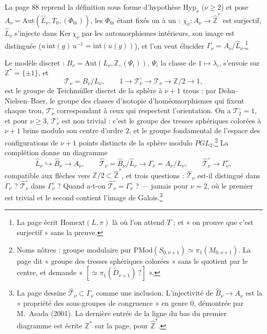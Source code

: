 \documentclass[11pt,a4paper]{article}
\begin{document}
La page 88 reprend la définition sous forme d'hypothèse $\mathrm{Hyp}_{\nu}$
($\nu \geqslant 2$) et pose $A_{\nu} = \mathrm{Aut}(\widehat{L}_{\nu}, T_{0},
(\Phi_{0i}))$, les $\Phi_{0i}$ étant fixés un à un : $\chi_{\nu} : A_{\nu} \to
\widehat{\mathbb{Z}}^{*}$ est surjectif, $\widehat{L}_{\nu}$ s'injecte dans
$\mathrm{Ker}\,\chi_{\nu}$ par les automorphismes intérieurs, son image est
distinguée ($u\, \mathrm{int}(g)\, u^{-1} = \mathrm{int}(u(g))$), et l'on veut
élucider $\Gamma_{\nu} = A_{\nu}/\widehat{L}_{\nu}$.\footnote{La page écrit
$\mathrm{Homext}(L, \pi)$ là où l'on attend $T$ ; et « on prouve que c'est
surjectif » sans la preuve.}

Le modèle discret : $B_{\nu} = \mathrm{Aut}(L_{\nu}, \mathbb{Z}, (\Psi_{i}))$, $\Psi_{i}$
la classe de $1 \mapsto \lambda_{i}$, s'envoie sur $\mathbb{Z}^{*} = \{\pm 1\}$, et
\[
\mathcal{T}_{\nu} = B_{\nu}/L_{\nu}, \qquad
1 \to \mathcal{T}^{\circ}_{\nu} \to \mathcal{T}_{\nu} \to \mathbb{Z}/2 \to 1,
\]
est le groupe de Teichmüller discret de la sphère à $\nu + 1$ trous : par
Dehn--Nielsen--Baer, le groupe des classes d'isotopie d'homéomorphismes qui
fixent chaque trou, $\mathcal{T}^{\circ}_{\nu}$ correspondant à ceux qui
respectent l'orientation. On a $\mathcal{T}^{\circ}_{2} = 1$, et pour $\nu
\geqslant 3$, $\mathcal{T}^{\circ}_{\nu}$ est non trivial : c'est le groupe des
tresses sphériques colorées à $\nu + 1$ brins modulo son centre d'ordre $2$,
et le groupe fondamental de l'espace des configurations de $\nu + 1$ points
distincts de la sphère modulo $PGL_{2}$.\footnote{Noms nôtres : groupe modulaire
pur $\mathrm{PMod}(S_{0,\nu+1}) \simeq \pi_{1}(M_{0,\nu+1})$. La page dit « groupe
des tresses sphériques colorées » sans le quotient par le centre, et demande
« $[\simeq \pi_{1}(\widetilde{D}_{\nu+1})\ ?]$ ».} La complétion donne un diagramme
\[
\widehat{L}_{\nu} \hookrightarrow \widehat{B}_{\nu} \to A_{\nu}, \qquad
\widehat{\mathcal{T}}_{\nu} = \widehat{B}_{\nu}/\widehat{L}_{\nu} \longrightarrow
\Gamma_{\nu} = A_{\nu}/\widehat{L}_{\nu}, \qquad
\widehat{\mathcal{T}}^{\circ}_{\nu} \to \Gamma^{\circ}_{\nu},
\]
compatible aux flèches vers $\mathbb{Z}/2 \subset \widehat{\mathbb{Z}}^{*}$, et
trois questions : $\widehat{\mathcal{T}}_{\nu}$ est-il distingué dans
$\Gamma_{\nu}$ ? $\widehat{\mathcal{T}}^{\circ}_{\nu}$ dans $\Gamma^{\circ}_{\nu}$ ?
Quand a-t-on $\widehat{\mathcal{T}}^{\circ}_{\nu} = \Gamma^{\circ}_{\nu}$ ? ---
jamais pour $\nu = 2$, où le premier est trivial et le second contient
l'image de Galois.\footnote{La page dessine $\widehat{\mathcal{T}}_{\nu} \subset
\Gamma_{\nu}$ comme une inclusion. L'injectivité de $\widehat{B}_{\nu} \to A_{\nu}$
est la « propriété des sous-groupes de congruence » en genre $0$, démontrée par
M.~Asada (2001). La dernière entrée de la ligne du bas du premier diagramme
est écrite $\mathbb{Z}^{*}$ sur la page, pour $\widehat{\mathbb{Z}}^{*}$.}
\end{document}
